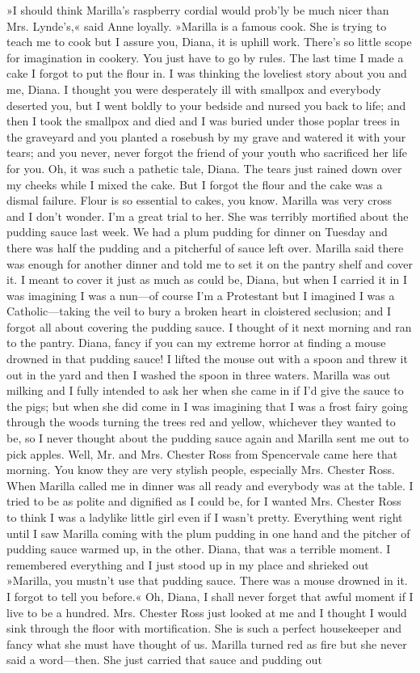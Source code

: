 »I should think Marilla's raspberry cordial would prob'ly be much nicer than Mrs. Lynde's,« said Anne loyally. »Marilla is a famous cook. She is trying to teach me to cook but I assure you, Diana, it is uphill work. There's so little scope for imagination in cookery. You just have to go by rules. The last time I made a cake I forgot to put the flour in. I was thinking the loveliest story about you and me, Diana. I thought you were desperately ill with smallpox and everybody deserted you, but I went boldly to your bedside and nursed you back to life; and then I took the smallpox and died and I was buried under those poplar trees in the graveyard and you planted a rosebush by my grave and watered it with your tears; and you never, never forgot the friend of your youth who sacrificed her life for you. Oh, it was such a pathetic tale, Diana. The tears just rained down over my cheeks while I mixed the cake. But I forgot the flour and the cake was a dismal failure. Flour is so essential to cakes, you know. Marilla was very cross and I don't wonder. I'm a great trial to her. She was terribly mortified about the pudding sauce last week. We had a plum pudding for dinner on Tuesday and there was half the pudding and a pitcherful of sauce left over. Marilla said there was enough for another dinner and told me to set it on the pantry shelf and cover it. I meant to cover it just as much as could be, Diana, but when I carried it in I was imagining I was a nun—of course I'm a Protestant but I imagined I was a Catholic—taking the veil to bury a broken heart in cloistered seclusion; and I forgot all about covering the pudding sauce. I thought of it next morning and ran to the pantry. Diana, fancy if you can my extreme horror at finding a mouse drowned in that pudding sauce! I lifted the mouse out with a spoon and threw it out in the yard and then I washed the spoon in three waters. Marilla was out milking and I fully intended to ask her when she came in if I'd give the sauce to the pigs; but when she did come in I was imagining that I was a frost fairy going through the woods turning the trees red and yellow, whichever they wanted to be, so I never thought about the pudding sauce again and Marilla sent me out to pick apples. Well, Mr. and Mrs. Chester Ross from Spencervale came here that morning. You know they are very stylish people, especially Mrs. Chester Ross. When Marilla called me in dinner was all ready and everybody was at the table. I tried to be as polite and dignified as I could be, for I wanted Mrs. Chester Ross to think I was a ladylike little girl even if I wasn't pretty. Everything went right until I saw Marilla coming with the plum pudding in one hand and the pitcher of pudding sauce warmed up, in the other. Diana, that was a terrible moment. I remembered everything and I just stood up in my place and shrieked out »Marilla, you mustn't use that pudding sauce. There was a mouse drowned in it. I forgot to tell you before.« Oh, Diana, I shall never forget that awful moment if I live to be a hundred. Mrs. Chester Ross just looked at me and I thought I would sink through the floor with mortification. She is such a perfect housekeeper and fancy what she must have thought of us. Marilla turned red as fire but she never said a word—then. She just carried that sauce and pudding out 